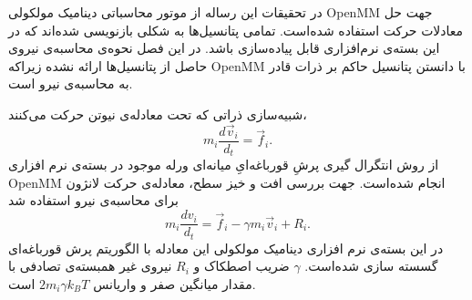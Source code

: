 در تحقیقات این رساله از موتور محاسباتی دینامیک مولکولی
OpenMM \cite{OpenMM2017}
جهت حل معادلات حرکت استفاده شده‌است. تمامی پتانسیل‌ها به شکلی بازنویسی شده‌اند که در این بسته‌ی نرم‌افزاری قابل پیاده‌سازی باشد. در این فصل نحوه‌ی محاسبه‌ی نیروی حاصل از پتانسیل‌ها ارائه نشده زیراکه 
OpenMM
با دانستن پتانسیل حاکم بر ذرات قادر به محاسبه‌ی نیرو است. 


شبیه‌سازی ذراتی که تحت معادله‌ی نیوتن حرکت می‌کنند، 
\begin{equation}
m_i\frac{d\vec v_i}{d_t}=\vec f_i.
\label{eq:newton}
\end{equation}
از روش انتگرال گیری پرشِ قورباغه‌‌ایِ میانه‌ای
ورله موجود در بسته‌ی نرم افزاری 
OpenMM
انجام شده‌است. جهت بررسی افت و خیز سطح، معادله‌ی حرکت لانژون برای محاسبه‌ی نیرو استفاده شد
 \begin{equation}
m_i\frac{dv_i}{d_t}=\vec f_i -\gamma m_i\vec v_i+R_i.
\label{eq:newton}
\end{equation}
در این بسته‌ی نرم افزاری دینامیک مولکولی این معادله با الگوریتم پرش قورباغه‌ای 
\cite{IZAGUIRRE2009}
گسسته سازی شده‌است. 
$\gamma$
ضریب اصطکاک و 
$R_i$
نیروی غیر همبسته‌ی تصادفی
 با مقدار میانگین صفر و واریانس
$2m_i\gamma k_BT$
است. 